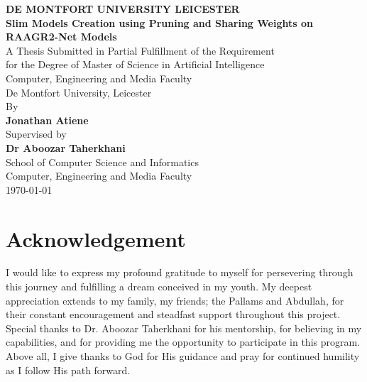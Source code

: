 \documentclass[12pt,a4paper]{article}
\begin{document}
\thispagestyle{empty}

\begin{center}
    \vspace*{1cm}
    {\large\textbf{DE MONTFORT UNIVERSITY LEICESTER}}\\[2cm]
    
    {\LARGE\textbf{Slim Models Creation using Pruning and Sharing Weights on RAAGR2-Net Models}}\\[2cm]
    
    {\large A Thesis Submitted in Partial Fulfillment of the Requirement\\
    for the Degree of Master of Science in Artificial Intelligence}\\[1cm]
    
    {\large Computer, Engineering and Media Faculty}\\[0.3cm]
    
    {\large De Montfort University, Leicester}\\[3cm]
    
    {\large By}\\[0.5cm]
    
    {\large\textbf{Jonathan Atiene}}\\[1.5cm]
    
    {\large Supervised by}\\[0.5cm]
    
    {\large\textbf{Dr Aboozar Taherkhani}}\\[0.5cm]
    
    {\large School of Computer Science and Informatics}\\[0.3cm]
    
    {\large Computer, Engineering and Media Faculty}\\[1cm]
    
    {\large\today}
\end{center}

\newpage

\section*{Acknowledgement}
I would like to express my profound gratitude to myself for persevering through this journey and fulfilling a dream conceived in my youth. My deepest appreciation extends to my family, my friends; the Pallams and Abdullah, for their constant encouragement and steadfast support throughout this project. Special thanks to Dr. Aboozar Taherkhani for his mentorship, for believing in my capabilities, and for providing me the opportunity to participate in this program. Above all, I give thanks to God for His guidance and pray for continued humility as I follow His path forward.
\end{document}
